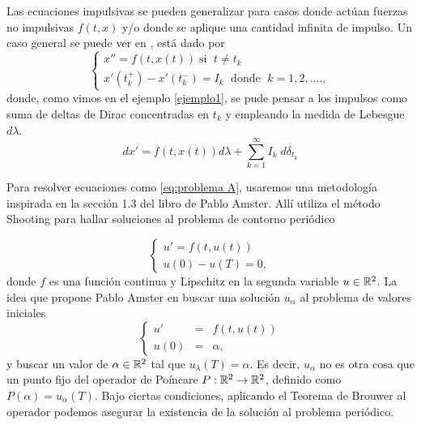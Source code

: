 
Las ecuaciones impulsivas se pueden generalizar para casos donde actúan fuerzas no impulsivas $f(t,x)$ y/o  donde se aplique una cantidad infinita de impulso. Un caso general se puede ver en \cite{Bainov}, está dado por
	\begin{equation*}
		\left\lbrace \begin{array}{l}
			x''=f(t,x(t)) \; \text{si }\; t\neq t_k\\
			 x'(t_k^+)-x'(t_k^-)=I_k \; \text{ donde }\; k=1,2,....,
		\end{array}\right. 
	\end{equation*}
donde, como vimos en el ejemplo \ref{ejemplo1}, se pude pensar a los impulsos como suma de deltas de Dirac concentradas en $t_k$ y 
empleando la medida de Lebesgue $d\lambda$.
$$dx'=f(t,x(t)) d\lambda +\sum_{k=1}^{\infty}I_k\;d\delta_{t_k}$$

Para resolver ecuaciones como \eqref{eq:problema A}, usaremos una 
metodología inspirada 
en   la sección 1.3 del
libro de Pablo Amster.
Allí utiliza el método Shooting para hallar soluciones al problema de contorno periódico 

	\begin{equation*}
		\left\lbrace \begin{array}{l}
			u'=f(t,u(t))\\
			u(0)-u(T)=0,
		\end{array}\right. 
	\end{equation*}
donde $f$ es una función continua y Lipschitz en la segunda variable $u\in\mathbb{R}^2$.  La idea que propone Pablo Amster  en buscar una solución $u_\alpha$ al problema de valores iniciales 
	\begin{equation*}
	\left\lbrace \begin{array}{lcl}
		u'&=&f(t,u(t))\\
		u(0)&=&\alpha,
	\end{array}\right. 
\end{equation*}
y buscar un valor de $\alpha\in\mathbb{R}^2$ tal que $u_\lambda(T)=\alpha$. Es decir,
$u_\alpha$ no es otra cosa que  un punto fijo del operador de Poíncare $P:\mathbb{R}^2\to \mathbb{R}^2$, definido como $P(\alpha)=u_\alpha(T)$. Bajo ciertas condiciones, aplicando el Teorema de Brouwer \cite{Amster} al operador podemos asegurar la existencia de la solución al problema periódico. 

